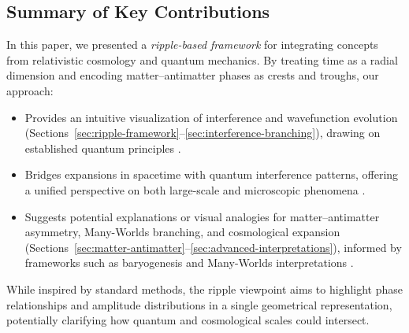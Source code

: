 \documentclass{article}
\begin{document}
\subsection{Summary of Key Contributions}
\label{subsec:summary-contributions}
In this paper, we presented a \emph{ripple-based framework} for integrating 
concepts from relativistic cosmology and quantum mechanics. By treating 
time as a radial dimension and encoding matter--antimatter phases as 
crests and troughs, our approach:
\begin{itemize}
  \item Provides an intuitive visualization of interference and wavefunction 
        evolution (Sections~\ref{sec:ripple-framework}--\ref{sec:interference-branching}), 
        drawing on established quantum principles \cite{griffiths2005introduction, feynmanlectures}.
  \item Bridges expansions in spacetime with quantum interference patterns, 
        offering a unified perspective on both large-scale and microscopic phenomena 
        \cite{penrose2004, susskind2008}.
  \item Suggests potential explanations or visual analogies for matter--antimatter 
        asymmetry, Many-Worlds branching, and cosmological expansion 
        (Sections~\ref{sec:matter-antimatter}--\ref{sec:advanced-interpretations}), 
        informed by frameworks such as baryogenesis \cite{Sakharov1967} and Many-Worlds 
        interpretations \cite{everett1957, dewitt1971}.
\end{itemize}
While inspired by standard methods, the ripple viewpoint aims to highlight 
phase relationships and amplitude distributions in a single geometrical 
representation, potentially clarifying how quantum and cosmological scales 
could intersect.
\end{document}
